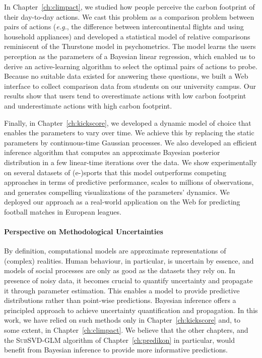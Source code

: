 In Chapter~\ref{ch:climpact}, we studied how people perceive the carbon footprint of their day-to-day actions.
We cast this problem as a comparison problem between pairs of actions (\textit{e.g.}, the difference between intercontinental flights and using household appliances) and developed a statistical model of relative comparisons reminiscent of the Thurstone model in psychometrics.
The model learns the users perception as the parameters of a Bayesian linear regression, which enabled us to derive an active-learning algorithm to select the optimal pairs of actions to probe.
Because no suitable data existed for answering these questions, we built a Web interface to collect comparison data from students on our university campus.
Our results show that users tend to overestimate actions with low carbon footprint and underestimate actions with high carbon footprint.

Finally, in Chapter~\ref{ch:kickscore}, we developed a dynamic model of choice that enables the parameters to vary over time.
We achieve this by replacing the static parameters by continuous-time Gaussian processes.
We also developed an efficient inference algorithm that computes an approximate Bayesian posterior distribution in a few linear-time iterations over the data.
We show experimentally on several datasets of (e-)sports that this model outperforms competing approaches in terms of predictive performance, scales to millions of observations, and generates compelling visualizations of the parameters' dynamics.
We deployed our approach as a real-world application on the Web for predicting football matches in European leagues.

\paragraph{Perspective on Methodological Uncertainties}

By definition, computational models are approximate representations of (complex) realities.
Human behaviour, in particular, is uncertain by essence, and models of social processes are only as good as the datasets they rely on.
In presence of noisy data, it becomes crucial to quantify uncertainty and propagate it through parameter estimation.
This enables a model to provide predictive distributions rather than point-wise predictions.
Bayesian inference offers a principled approach to achieve uncertainty quantification and propagation.
In this work, we have relied on such methods only in Chapter~\ref{ch:kickscore} and, to some extent, in Chapter~\ref{ch:climpact}.
We believe that the other chapters, and the \textsc{SubSVD-GLM} algorithm of Chapter~\ref{ch:predikon} in particular, would benefit from Bayesian inference to provide more informative predictions.

